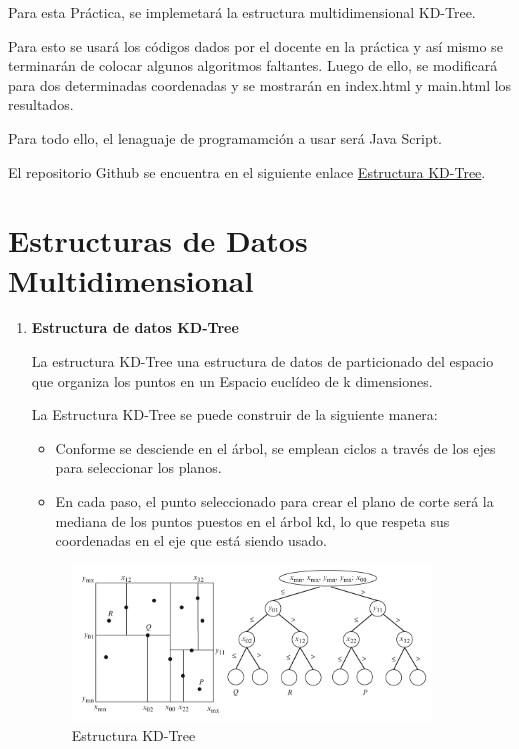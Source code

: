 \documentclass{article}
\begin{document}
	Para esta Práctica, se implemetará la estructura multidimensional KD-Tree.

    Para esto se usará los códigos dados por el docente en la práctica y así mismo se terminarán de colocar algunos algoritmos faltantes. Luego de ello, se modificará para dos determinadas coordenadas y se mostrarán en index.html y main.html los resultados.

    Para todo ello, el lenaguaje de programamción a usar será Java Script.
	
 El repositorio Github se encuentra en el siguiente enlace \href{https://github.com/nestorcal/kdtree}{Estructura KD-Tree}.
	
	\section{Estructuras de Datos Multidimensional}\label{sec:ejercicios}
	\begin{enumerate}
		\item \textbf{Estructura de datos KD-Tree}
		
			La estructura KD-Tree una estructura de datos de particionado del espacio que organiza los puntos en un Espacio euclídeo de k dimensiones.

La Estructura KD-Tree se puede construir de la siguiente manera: 

\begin{itemize}
   \item Conforme se desciende en el árbol, se emplean ciclos a través de los ejes para seleccionar los planos.
   \item En cada paso, el punto seleccionado para crear el plano de corte será la mediana de los puntos puestos en el árbol kd, lo que respeta sus coordenadas en el eje que está siendo usado.

\end{itemize}	

\begin{figure}[H]
\centering
\includegraphics[width=0.9\textwidth]{Img/KD-Tree.png}
\caption{Estructura KD-Tree}
\end{figure}

\end{enumerate}
\end{document}
